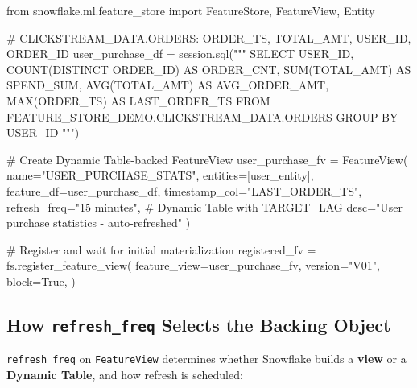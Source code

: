 \documentclass[
  letterpaper,
  DIV=11,
  numbers=noendperiod]{scrreprt}
\newenvironment{Shaded}{\begin{snugshade}}{\end{snugshade}}
\newcommand{\CommentTok}[1]{\textcolor[rgb]{0.37,0.37,0.37}{#1}}
\newcommand{\ImportTok}[1]{\textcolor[rgb]{0.00,0.46,0.62}{#1}}
\newcommand{\NormalTok}[1]{\textcolor[rgb]{0.00,0.23,0.31}{#1}}
\newcommand{\OperatorTok}[1]{\textcolor[rgb]{0.37,0.37,0.37}{#1}}
\newcommand{\StringTok}[1]{\textcolor[rgb]{0.13,0.47,0.30}{#1}}
\newcommand{\VariableTok}[1]{\textcolor[rgb]{0.07,0.07,0.07}{#1}}
\begin{document}
\begin{Shaded}
\begin{Highlighting}[]
\ImportTok{from}\NormalTok{ snowflake.ml.feature\_store }\ImportTok{import}\NormalTok{ FeatureStore, FeatureView, Entity}

\CommentTok{\# CLICKSTREAM\_DATA.ORDERS: ORDER\_TS, TOTAL\_AMT, USER\_ID, ORDER\_ID}
\NormalTok{user\_purchase\_df }\OperatorTok{=}\NormalTok{ session.sql(}\StringTok{"""}
\StringTok{    SELECT }
\StringTok{        USER\_ID,}
\StringTok{        COUNT(DISTINCT ORDER\_ID) AS ORDER\_CNT,}
\StringTok{        SUM(TOTAL\_AMT) AS SPEND\_SUM,}
\StringTok{        AVG(TOTAL\_AMT) AS AVG\_ORDER\_AMT,}
\StringTok{        MAX(ORDER\_TS) AS LAST\_ORDER\_TS}
\StringTok{    FROM FEATURE\_STORE\_DEMO.CLICKSTREAM\_DATA.ORDERS}
\StringTok{    GROUP BY USER\_ID}
\StringTok{"""}\NormalTok{)}

\CommentTok{\# Create Dynamic Table{-}backed FeatureView}
\NormalTok{user\_purchase\_fv }\OperatorTok{=}\NormalTok{ FeatureView(}
\NormalTok{    name}\OperatorTok{=}\StringTok{"USER\_PURCHASE\_STATS"}\NormalTok{,}
\NormalTok{    entities}\OperatorTok{=}\NormalTok{[user\_entity],}
\NormalTok{    feature\_df}\OperatorTok{=}\NormalTok{user\_purchase\_df,}
\NormalTok{    timestamp\_col}\OperatorTok{=}\StringTok{"LAST\_ORDER\_TS"}\NormalTok{,}
\NormalTok{    refresh\_freq}\OperatorTok{=}\StringTok{"15 minutes"}\NormalTok{,  }\CommentTok{\# Dynamic Table with TARGET\_LAG}
\NormalTok{    desc}\OperatorTok{=}\StringTok{"User purchase statistics {-} auto{-}refreshed"}
\NormalTok{)}

\CommentTok{\# Register and wait for initial materialization}
\NormalTok{registered\_fv }\OperatorTok{=}\NormalTok{ fs.register\_feature\_view(}
\NormalTok{    feature\_view}\OperatorTok{=}\NormalTok{user\_purchase\_fv,}
\NormalTok{    version}\OperatorTok{=}\StringTok{"V01"}\NormalTok{,}
\NormalTok{    block}\OperatorTok{=}\VariableTok{True}\NormalTok{,}
\NormalTok{)}
\end{Highlighting}
\end{Shaded}

\hypertarget{how-refresh_freq-selects-the-backing-object}{%
\subsection{\texorpdfstring{How \texttt{refresh\_freq} Selects the
Backing
Object}{How refresh\_freq Selects the Backing Object}}\label{how-refresh_freq-selects-the-backing-object}}

\texttt{refresh\_freq} on \texttt{FeatureView} determines whether
Snowflake builds a \textbf{view} or a \textbf{Dynamic Table}, and how
refresh is scheduled:
\end{document}
